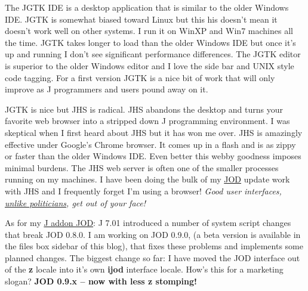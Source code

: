 The JGTK IDE is a desktop application that is similar to the older
Windows IDE. JGTK is somewhat biased toward Linux but this his doesn't
mean it doesn't work well on other systems. I run it on WinXP and Win7
machines all the time. JGTK takes longer to load than the older Windows
IDE but once it's up and running I don't see significant performance
differences. The JGTK editor is superior to the older Windows editor and
I love the side bar and UNIX style code tagging. For a first version
JGTK is a nice bit of work that will only improve as J programmers and
users pound away on it.

JGTK is nice but JHS is radical. JHS abandons the desktop and turns your
favorite web browser into a stripped down J programming environment. I
was skeptical when I first heard about JHS but it has won me over. JHS
is amazingly effective under Google's Chrome browser. It comes up in a
flash and is as zippy or faster than the older Windows IDE. Even better
this webby goodness imposes minimal burdens. The JHS web server is often
one of the smaller processes running on my machines. I have been doing
the bulk of my
\href{https://docs.google.com/View?docID=dhnms2p5\_80f4nj56c5\&revision=\_latest}{JOD}
update work with JHS and I frequently forget I'm using a browser!
\emph{Good user
interfaces,} \emph{\href{http://www.nationalreview.com/articles/225959/coming-obama-thugocracy/michael-barone}{unlike
politicians}}\emph{, get out of your face!}

As for my \href{http://www.jsoftware.com/jwiki/Addons/general/jod}{J
addon JOD}: J 7.01 introduced a number of system script changes that
break JOD 0.8.0. I am working on JOD 0.9.0, (a beta version is available
in the files box sidebar of this blog), that fixes these problems and
implements some planned changes. The biggest change so far: I have moved
the JOD interface out of the \textbf{z} locale into it's own
\textbf{ijod} interface locale. How's this for a marketing slogan?
\textbf{JOD 0.9.x -- now with less z stomping!}




%